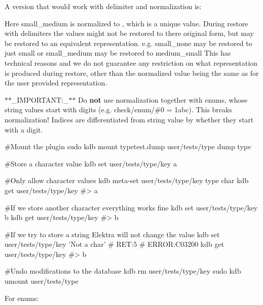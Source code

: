 A version that would work with delimiter and normalization is\+:




Here {\ttfamily small\+\_\+medium} is normalized to {}, which is a unique value. During restore with delimiters the values might not be restored to there original form, but may be restored to an equivalent representation. e.\+g. {\ttfamily small\+\_\+none} may be restored to just {\ttfamily small} or {\ttfamily small\+\_\+medium} may be restored to {\ttfamily medium\+\_\+small} This has technical reasons and we do not guarantee any restriction on what representation is produced during restore, other than the normalized value being the same as for the user provided representation.

$\ast$$\ast$\+\_\+\+I\+M\+P\+O\+R\+T\+A\+NT\+:\+\_\+$\ast$$\ast$ Do {\bfseries not} use normalization together with enums, whose string values start with digits (e.\+g. {\ttfamily check/enum/\#0 = 1abc}). This breaks normalization! Indices are differentiated from string value by whether they start with a digit.


\begin{DoxyCode}
#Mount the plugin
sudo kdb mount typetest.dump user/tests/type dump type

#Store a character value
kdb set user/tests/type/key a

#Only allow character values
kdb meta-set user/tests/type/key type char
kdb get user/tests/type/key
#> a

#If we store another character everything works fine
kdb set user/tests/type/key b
kdb get user/tests/type/key
#> b

#If we try to store a string Elektra will not change the value
kdb set user/tests/type/key 'Not a char'
# RET:5
# ERROR:C03200
kdb get user/tests/type/key
#> b

#Undo modifications to the database
kdb rm user/tests/type/key
sudo kdb umount user/tests/type
\end{DoxyCode}


For enums\+:




